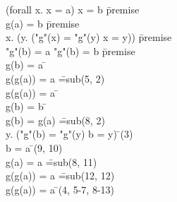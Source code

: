 \documentclass{article}
\begin{document}
\begin{proofbox}
\: (forall x. x = a) \lor x = b \= \hbox{premise} \\
\: g(a) = b \= \hbox{premise} \\
\: \forall x. (\forall y. ("g"(x) = "g"(y) \rightarrow x = y)) \= \hbox{premise} \\
\: "g"(b) = a \lor "g"(b) = b \= \hbox{premise} \\
\openAlt
\: g(b) = a \= \asm \\
\: g(g(a)) = a \= =\hbox{sub}(5, 2) \\
\: g(g(a)) = a \=  \\
\splitAlt
\: g(b) = b \= \asm \\
\: g(b) = g(a) \= =\hbox{sub}(8, 2) \\
\: \forall y. ("g"(b) = "g"(y) \rightarrow b = y) \= \forallelim(3) \\
\: b = a \= \forallelim(9, 10) \\
\: g(a) = a \= =\hbox{sub}(8, 11) \\
\: g(g(a)) = a \= =\hbox{sub}(12, 12) \\
\closeAlt
\: g(g(a)) = a \= \orelim(4, 5-7, 8-13) \\
\end{proofbox}
\end{document}
